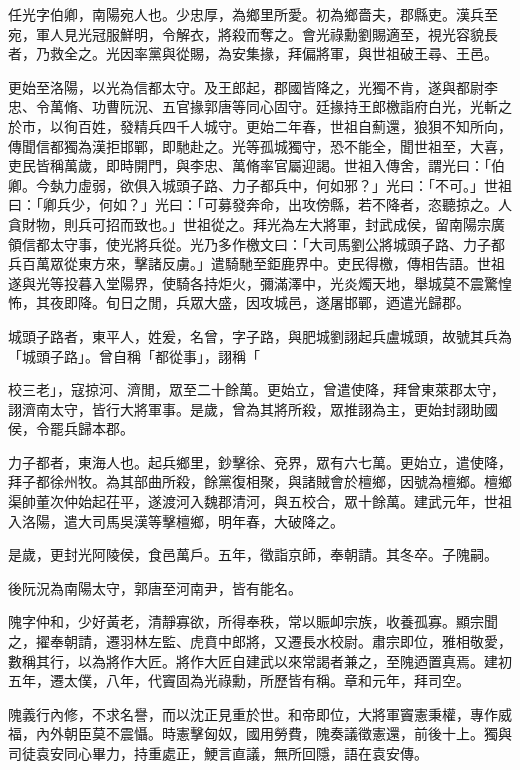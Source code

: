 
\begin{pinyinscope}
任光字伯卿，南陽宛人也。少忠厚，為鄉里所愛。初為鄉嗇夫，郡縣吏。漢兵至宛，軍人見光冠服鮮明，令解衣，將殺而奪之。會光祿勳劉賜適至，視光容貌長者，乃救全之。光因率黨與從賜，為安集掾，拜偏將軍，與世祖破王尋、王邑。

更始至洛陽，以光為信都太守。及王郎起，郡國皆降之，光獨不肯，遂與都尉李忠、令萬脩、功曹阮況、五官掾郭唐等同心固守。廷掾持王郎檄詣府白光，光斬之於巿，以徇百姓，發精兵四千人城守。更始二年春，世祖自薊還，狼狽不知所向，傳聞信都獨為漢拒邯鄲，即馳赴之。光等孤城獨守，恐不能全，聞世祖至，大喜，吏民皆稱萬歲，即時開門，與李忠、萬脩率官屬迎謁。世祖入傳舍，謂光曰：「伯卿。今埶力虛弱，欲俱入城頭子路、力子都兵中，何如邪？」光曰：「不可。」世祖曰：「卿兵少，何如？」光曰：「可募發奔命，出攻傍縣，若不降者，恣聽掠之。人貪財物，則兵可招而致也。」世祖從之。拜光為左大將軍，封武成侯，留南陽宗廣領信都太守事，使光將兵從。光乃多作檄文曰：「大司馬劉公將城頭子路、力子都兵百萬眾從東方來，擊諸反虜。」遣騎馳至鉅鹿界中。吏民得檄，傳相告語。世祖遂與光等投暮入堂陽界，使騎各持炬火，彌滿澤中，光炎燭天地，舉城莫不震驚惶怖，其夜即降。旬日之閒，兵眾大盛，因攻城邑，遂屠邯鄲，迺遣光歸郡。

城頭子路者，東平人，姓爰，名曾，字子路，與肥城劉詡起兵盧城頭，故號其兵為「城頭子路」。曾自稱「都從事」，詡稱「

校三老」，寇掠河、濟閒，眾至二十餘萬。更始立，曾遣使降，拜曾東萊郡太守，詡濟南太守，皆行大將軍事。是歲，曾為其將所殺，眾推詡為主，更始封詡助國侯，令罷兵歸本郡。

力子都者，東海人也。起兵鄉里，鈔擊徐、兗界，眾有六七萬。更始立，遣使降，拜子都徐州牧。為其部曲所殺，餘黨復相聚，與諸賊會於檀鄉，因號為檀鄉。檀鄉渠帥董次仲始起茌平，遂渡河入魏郡清河，與五校合，眾十餘萬。建武元年，世祖入洛陽，遣大司馬吳漢等擊檀鄉，明年春，大破降之。

是歲，更封光阿陵侯，食邑萬戶。五年，徵詣京師，奉朝請。其冬卒。子隗嗣。

後阮況為南陽太守，郭唐至河南尹，皆有能名。

隗字仲和，少好黃老，清靜寡欲，所得奉秩，常以賑卹宗族，收養孤寡。顯宗聞之，擢奉朝請，遷羽林左監、虎賁中郎將，又遷長水校尉。肅宗即位，雅相敬愛，數稱其行，以為將作大匠。將作大匠自建武以來常謁者兼之，至隗迺置真焉。建初五年，遷太僕，八年，代竇固為光祿勳，所歷皆有稱。章和元年，拜司空。

隗義行內修，不求名譽，而以沈正見重於世。和帝即位，大將軍竇憲秉權，專作威福，內外朝臣莫不震懾。時憲擊匈奴，國用勞費，隗奏議徵憲還，前後十上。獨與司徒袁安同心畢力，持重處正，鯁言直議，無所回隱，語在袁安傳。


\end{pinyinscope}
